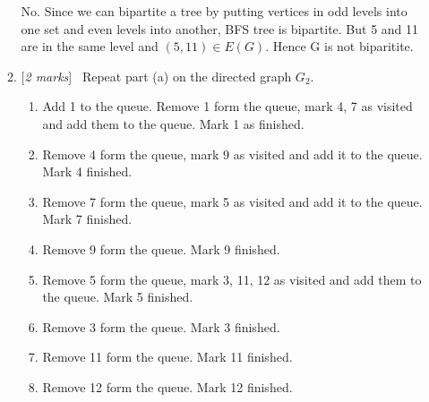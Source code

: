 \documentclass[11pt]{article}
\newcommand{\Q}[1]{\medskip\item {[{\em #1 marks\/}]}\ }
\begin{document}
\begin{enumerate}
\begin{enumerate}
		No. Since we can bipartite a tree by putting vertices in odd levels into one set and even levels into 
		another, BFS tree is bipartite. But 5 and 11 are in the same level and $(5, 11) \in E(G)$. Hence G is 
		not biparitite.

	\Q{2} Repeat part (a) on the directed graph $G_2$.
	\begin{center}
	\end{center}
	\begin{enumerate}[label={\arabic*.}]
		\item Add 1 to the queue. Remove 1 form the queue, mark 4, 7 as visited and 
		add them to the queue. Mark 1 as finished.
		\item Remove 4 form the queue, mark 9 as visited and add it to the queue. Mark 4 finished.
		\item Remove 7 form the queue, mark 5 as visited and add it to the queue. Mark 7 finished.
		\item Remove 9 form the queue. Mark 9 finished.
		\item Remove 5 form the queue, mark 3, 11, 12 as visited and add them to the queue. Mark 5 finished.
		\item Remove 3 form the queue. Mark 3 finished.
		\item Remove 11 form the queue. Mark 11 finished.
		\item Remove 12 form the queue. Mark 12 finished.
	\end{enumerate}
	

\end{enumerate}
\end{enumerate}
\end{document}
